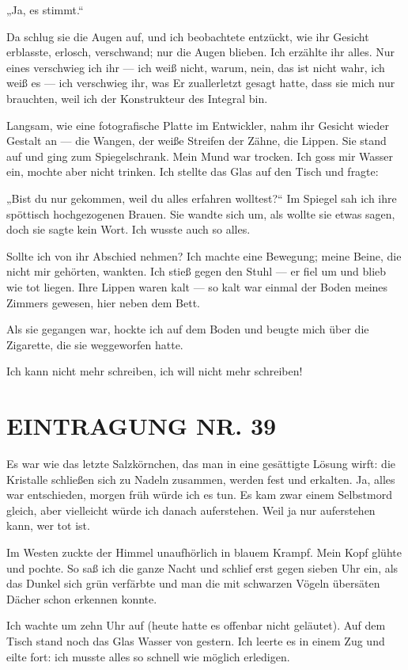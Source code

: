 „Ja, es stimmt.“

Da schlug sie die Augen auf, und ich beobachtete entzückt, wie ihr
Gesicht erblasste, erlosch, verschwand; nur die Augen blieben. Ich
erzählte ihr alles. Nur eines verschwieg ich ihr — ich weiß nicht,
warum, nein, das ist nicht wahr, ich weiß es — ich verschwieg ihr,
was Er zuallerletzt gesagt hatte, dass sie mich nur brauchten, weil
ich der Konstrukteur des Integral bin.

Langsam, wie eine
fotografische Platte im Entwickler, nahm ihr Gesicht wieder Gestalt
an — die Wangen, der weiße Streifen der Zähne, die Lippen. Sie
stand auf und ging zum Spiegelschrank. Mein Mund war trocken. Ich
goss mir Wasser ein, mochte aber nicht trinken. Ich stellte das
Glas auf den Tisch und fragte:

„Bist du nur gekommen, weil du alles erfahren wolltest?“ Im Spiegel
sah ich ihre spöttisch hochgezogenen Brauen. Sie wandte sich um,
als wollte sie etwas sagen, doch sie sagte kein Wort. Ich wusste
auch so alles.

Sollte ich von ihr Abschied nehmen? Ich machte eine
Bewegung; meine Beine, die nicht mir gehörten, wankten. Ich stieß
gegen den Stuhl — er fiel um und blieb wie tot liegen. Ihre Lippen
waren kalt — so kalt war einmal der Boden meines Zimmers gewesen,
hier neben dem Bett.

Als sie gegangen war, hockte ich auf dem Boden und beugte mich über
die Zigarette, die sie weggeworfen
hatte.

Ich kann nicht mehr schreiben, ich will nicht mehr schreiben!

\section{EINTRAGUNG NR. 39}

Es war wie das letzte Salzkörnchen, das man in eine gesättigte
Lösung wirft: die Kristalle schließen sich zu Nadeln zusammen,
werden fest und erkalten. Ja, alles war entschieden, morgen früh
würde ich es tun. Es kam zwar einem Selbstmord gleich, aber
vielleicht würde ich danach auferstehen. Weil ja nur auferstehen
kann, wer tot ist.

Im Westen zuckte der Himmel unaufhörlich in blauem Krampf. Mein
Kopf glühte und pochte. So saß ich die ganze Nacht und schlief erst
gegen sieben Uhr ein, als das Dunkel sich grün verfärbte und man
die mit schwarzen Vögeln übersäten Dächer schon erkennen konnte.

Ich wachte um zehn Uhr auf (heute hatte es offenbar nicht
geläutet). Auf dem Tisch stand noch das Glas Wasser von gestern.
Ich leerte es in einem Zug und eilte fort: ich musste alles so
schnell wie möglich erledigen.

